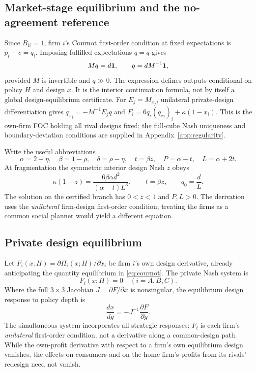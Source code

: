 \documentclass[11pt,a4paper]{article}
\theoremstyle{remark}\newtheorem{remark}[theorem]{Remark}
\begin{document}
\subsection{Market-stage equilibrium and the no-agreement reference}
Since $B_{ii}=1$, firm $i$'s Cournot first-order condition at fixed expectations is $p_i-c=q_i$. Imposing fulfilled expectations $\bar q=q$ gives
\begin{equation}\label{eq:cournot}
M q=d\boldsymbol{1},\qquad q=d M^{-1}\boldsymbol{1},
\end{equation}
provided $M$ is invertible and $q\gg0$. The expression defines outputs conditional on policy $H$ and design $x$. It is the interior continuation formula, not by itself a global design-equilibrium certificate. For $E_j=M_{x_j}$, unilateral private-design differentiation gives $q_{x_j}=-M^{-1}E_jq$ and $F_i=6q_i(q_{x_i})_i+\kappa(1-x_i)$. This is the own-firm FOC holding all rival designs fixed; the full-cube Nash uniqueness and boundary-deviation conditions are supplied in Appendix~\ref{app:regularity}.

Write the useful abbreviations
\begin{equation}\label{eq:abbrev}
\alpha=2-\eta,\quad\beta=1-\rho,\quad\delta=\rho-\eta,\quad
t=\beta z,\quad P=\alpha-t,\quad L=\alpha+2t.
\end{equation}
At fragmentation the symmetric interior design Nash $z$ obeys
\begin{equation}\label{eq:root}
\kappa(1-z)=\frac{6\beta\alpha d^2}{(\alpha-t)L^3},\qquad t=\beta z,\qquad q_0=\frac dL.
\end{equation}
The solution on the certified branch has $0<z<1$ and $P,L>0$. The derivation uses the \emph{unilateral} firm-design first-order condition; treating the firms as a common social planner would yield a different equation.

\subsection{Private design equilibrium}
Let $F_i(x;H)=\partial\Pi_i(x;H)/\partial x_i$ be firm $i$'s own design derivative, already anticipating the quantity equilibrium in \eqref{eq:cournot}. The private Nash system is
\begin{equation}\label{eq:designFOC}
F_i(x;H)=0\quad (i=A,B,C).
\end{equation}
Where the full $3\times3$ Jacobian $J=\partial F/\partial x$ is nonsingular, the equilibrium design response to policy depth is
\begin{equation}\label{eq:implicit}
\frac{dx}{dg}=-J^{-1}\frac{\partial F}{\partial g}.
\end{equation}
The simultaneous system incorporates all strategic responses: $F_i$ is each firm's \emph{unilateral} first-order condition, not a derivative along a common-design path. While the own-profit derivative with respect to a firm's own equilibrium design vanishes, the effects on consumers and on the home firm's profits from its rivals' redesign need not vanish.
\end{document}

